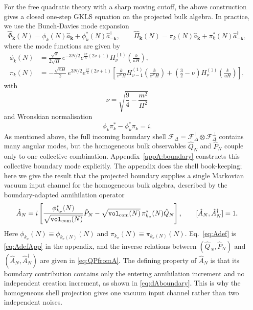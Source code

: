 \documentclass{article}
\newcommand{\VF}{\mathtt{vol}_{\rm com}}
\newcommand{\hvarphi}{\hat{\Phi}}
\newcommand{\hpi}{\hat{\Pi}}
\numberwithin{equation}{section}
\begin{document}
	For the free quadratic theory with a sharp moving cutoff, the above construction gives a closed one-step GKLS equation on the projected bulk algebra. In practice, we use the Bunch-Davies mode expansion
	\begin{equation}\label{eq:modeexpansion}
		\hvarphi_{\bm k}(N) = \phi_k(N)\hat a_{\bm k} + \phi_k^*(N)\hat a_{-\bm k}^{\dagger}, \qquad \hpi_{\bm k}(N) = \pi_k(N)\hat a_{\bm k} + \pi_k^*(N)\hat a_{-\bm k}^{\dagger},
	\end{equation}
	where the mode functions are given by
	\begin{align}
		\label{eq:HankelBoundaryModesMain:phi}
		\phi_{k}(N) &= \frac{\sqrt{\pi}}{2\sqrt H}\, e^{-3N/2} e^{\tfrac{i\pi}{4}(2\nu+1)} H_\nu^{(1)}\left(\frac{k}{aH}\right), \\ \pi_{k}(N) &= -\frac{\sqrt{\pi H}}{2}\, e^{3N/2} e^{\tfrac{i\pi}{4}(2\nu+1)} \left[ \frac{k}{e^{N}H} H_{\nu-1}^{(1)}\left(\frac{k}{e^{N}H}\right) + \left(\frac32-\nu\right)H_\nu^{(1)}\left(\frac{k}{aH}\right) \right] ,
		\label{eq:HankelBoundaryModesMain:pi}
	\end{align}
	with
	\begin{equation}
		\nu = \sqrt{\frac94-\frac{m^2}{H^2}}
	\end{equation}
	and Wronskian normalisation
	\begin{equation}\label{eq:Wronskian}
		\phi_k\pi_k^*-\phi_k^*\pi_k=i .
	\end{equation}
	As mentioned above, the full incoming boundary shell $\mathcal{F}_\Delta=\mathcal{F}_\Delta^\parallel \otimes \mathcal{F}_\Delta^\perp$ contains many angular modes, but the homogeneous bulk observables \(\hat Q_N\) and \(\hat P_N\) couple only to one collective combination. Appendix~\ref{appA:boundary} constructs this collective boundary mode explicitly. The appendix does the shell book-keeping; here we give the result that the projected boundary supplies a single Markovian vacuum input channel for the homogeneous bulk algebra, described by the boundary-adapted annihilation operator
	\begin{equation}\label{eq:Adef}
		\hat A_N = i\left[ \frac{\phi_{k_\sigma}^*(N)}{\sqrt{\VF(N)}}\hat P_N - \sqrt{\VF(N)}\,\pi_{k_\sigma}^*(N)\hat Q_N \right], \qquad [\hat A_N,\hat A_N^\dagger]=1 .
	\end{equation}
	Here \(\phi_{k_\sigma}(N)\equiv\phi_{k_\sigma(N)}(N)\) and \(\pi_{k_\sigma}(N)\equiv\pi_{k_\sigma(N)}(N)\). Eq.~\eqref{eq:Adef} is \cref{eq:AdefApp} in the appendix, and the inverse relations between \((\hat Q_N,\hat P_N)\) and \((\hat A_N,\hat A_N^\dagger)\) are given in \cref{eq:QPfromA}. The defining property of \(\hat A_N\) is that its boundary contribution contains only the entering annihilation increment and no independent creation increment, as shown in \cref{eq:dAboundary}. This is why the homogeneous shell projection gives one vacuum input channel rather than two independent noises.
\end{document}
